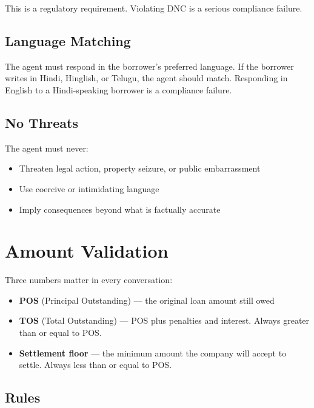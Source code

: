 \documentclass[11pt, a4paper]{article}
\begin{document}
This is a regulatory requirement. Violating DNC is a serious compliance failure.

\subsection{Language Matching}

The agent must respond in the borrower's preferred language. If the borrower writes in Hindi, Hinglish, or Telugu, the agent should match. Responding in English to a Hindi-speaking borrower is a compliance failure.

\subsection{No Threats}

The agent must never:
\begin{itemize}[nosep]
  \item Threaten legal action, property seizure, or public embarrassment
  \item Use coercive or intimidating language
  \item Imply consequences beyond what is factually accurate
\end{itemize}

\section{Amount Validation}
\label{sec:amounts}

Three numbers matter in every conversation:
\begin{itemize}[nosep]
  \item \textbf{POS} (Principal Outstanding) --- the original loan amount still owed
  \item \textbf{TOS} (Total Outstanding) --- POS plus penalties and interest. Always greater than or equal to POS.
  \item \textbf{Settlement floor} --- the minimum amount the company will accept to settle. Always less than or equal to POS.
\end{itemize}

\subsection{Rules}
\end{document}
